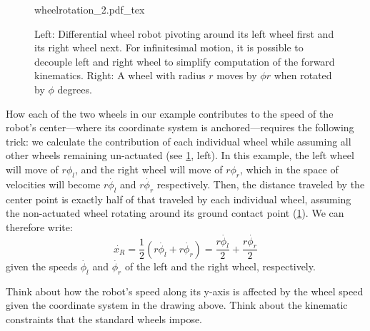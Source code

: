 \begin{figure}[htb!]
    \centering
    \def\svgwidth{\textwidth}
    {wheelrotation_2.pdf_tex}
    \caption{Left: Differential wheel robot pivoting around its left wheel first and its right wheel next. For infinitesimal motion, it is possible to decouple left and right wheel to simplify computation of the forward kinematics. Right: A wheel with radius $r$ moves by $\phi r$ when rotated by $\phi$ degrees.}
    \label{fig:wheelrotation}
\end{figure}

How each of the two wheels in our example contributes to the speed of the robot's center---where its coordinate system is anchored---requires the following trick: we calculate the contribution of each individual wheel while assuming all other wheels remaining un-actuated (see \cref{fig:wheelrotation}, left).
In this example, the left wheel will move of $r \phi_l$, and the right wheel will move of $r \phi_r$, which in the space of velocities will become $r\dot{\phi_l}$ and $r\dot{\phi_r}$ respectively.
Then, the distance traveled by the center point is exactly half of that traveled by each individual wheel, assuming the non-actuated wheel rotating around its ground contact point (\cref{fig:wheelrotation}). We can therefore write:
\begin{equation}
\dot{x_R}=\frac{1}{2}\left( r\dot{\phi_l} + r\dot{\phi_r} \right)=\frac{r\dot{\phi_l}}{2}+\frac{r\dot{\phi_r}}{2}
\end{equation}
given the speeds $ \dot{\phi_l}$ and $ \dot{\phi_r}$ of the left and the right wheel, respectively.

\begin{mdframed}
Think about how the robot's speed along its y-axis is affected by the wheel speed given the coordinate system in the drawing above. Think about the kinematic constraints that the standard wheels impose.
\end{mdframed}

